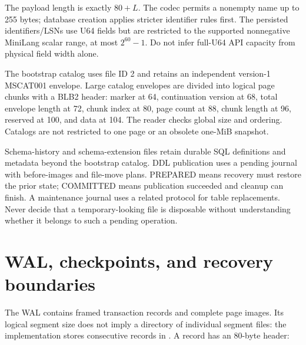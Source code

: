 The payload length is exactly $80+L$. The codec permits a nonempty name up to 255 bytes; database creation applies stricter identifier rules first. The persisted identifiers/LSNs use U64 fields but are restricted to the supported nonnegative MiniLang scalar range, at most $2^{60}-1$. Do not infer full-U64 API capacity from physical field width alone.

The bootstrap catalog uses file ID 2 and retains an independent version-1 MSCAT001 envelope. Large catalog envelopes are divided into logical page chunks with a BLB2 header: marker at 64, continuation version at 68, total envelope length at 72, chunk index at 80, page count at 88, chunk length at 96, reserved at 100, and data at 104. The reader checks global size and ordering. Catalogs are not restricted to one page or an obsolete one-MiB snapshot.

Schema-history and schema-extension files retain durable SQL definitions and metadata beyond the bootstrap catalog. DDL publication uses a pending journal with before-images and file-move plans. PREPARED means recovery must restore the prior state; COMMITTED means publication succeeded and cleanup can finish. A maintenance journal uses a related protocol for table replacements. Never decide that a temporary-looking file is disposable without understanding whether it belongs to such a pending operation.


\section{WAL, checkpoints, and recovery boundaries}

The WAL contains framed transaction records and complete page images. Its logical segment size does not imply a directory of individual segment files: the implementation stores consecutive records in . A record has an 80-byte header:

